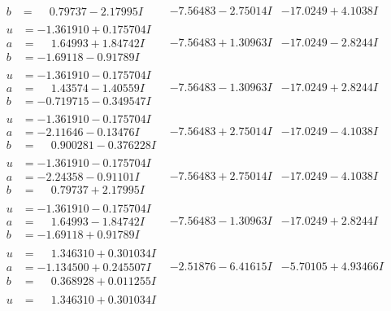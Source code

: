 \documentclass[1p]{elsarticle_modified}
\theoremstyle{definition}
\begin{document}
$$\begin{array}{c|c|c}
\begin{aligned}
b &= \phantom{-}0.79737 - 2.17995 I\end{aligned}
 & -7.56483 - 2.75014 I & -17.0249 + 4.1038 I \\ \hline\begin{aligned}
u &= -1.361910 + 0.175704 I \\
a &= \phantom{-}1.64993 + 1.84742 I \\
b &= -1.69118 - 0.91789 I\end{aligned}
 & -7.56483 + 1.30963 I & -17.0249 - 2.8244 I \\ \hline\begin{aligned}
u &= -1.361910 - 0.175704 I \\
a &= \phantom{-}1.43574 - 1.40559 I \\
b &= -0.719715 - 0.349547 I\end{aligned}
 & -7.56483 - 1.30963 I & -17.0249 + 2.8244 I \\ \hline\begin{aligned}
u &= -1.361910 - 0.175704 I \\
a &= -2.11646 - 0.13476 I \\
b &= \phantom{-}0.900281 - 0.376228 I\end{aligned}
 & -7.56483 + 2.75014 I & -17.0249 - 4.1038 I \\ \hline\begin{aligned}
u &= -1.361910 - 0.175704 I \\
a &= -2.24358 - 0.91101 I \\
b &= \phantom{-}0.79737 + 2.17995 I\end{aligned}
 & -7.56483 + 2.75014 I & -17.0249 - 4.1038 I \\ \hline\begin{aligned}
u &= -1.361910 - 0.175704 I \\
a &= \phantom{-}1.64993 - 1.84742 I \\
b &= -1.69118 + 0.91789 I\end{aligned}
 & -7.56483 - 1.30963 I & -17.0249 + 2.8244 I \\ \hline\begin{aligned}
u &= \phantom{-}1.346310 + 0.301034 I \\
a &= -1.134500 + 0.245507 I \\
b &= \phantom{-}0.368928 + 0.011255 I\end{aligned}
 & -2.51876 - 6.41615 I & -5.70105 + 4.93466 I \\ \hline\begin{aligned}
u &= \phantom{-}1.346310 + 0.301034 I \\

\end{aligned}
\end{array}$$
\end{document}
